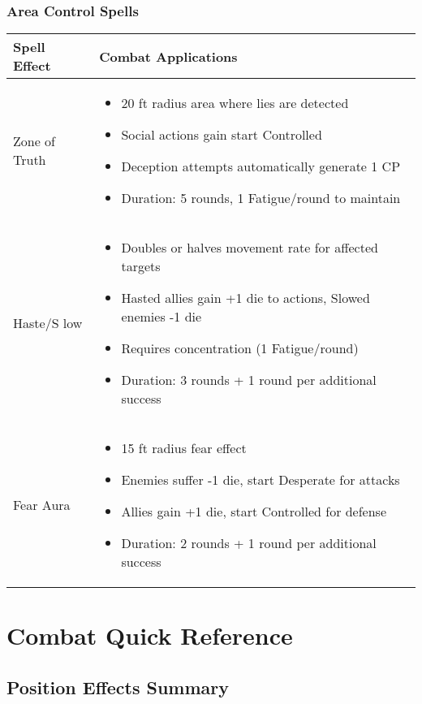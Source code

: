 \documentclass[11pt,letterpaper]{article}
\begin{document}
\subsubsection{Area Control Spells}

\begin{longtable}{|>{\raggedright\arraybackslash}p{4cm}|>{\raggedright\arraybackslash}p{8cm}|}
\hline
\textbf{Spell Effect} & \textbf{Combat Applications} \\
\hline
Zone of Truth & 
\begin{itemize}
    \item 20 ft radius area where lies are detected
    \item Social actions gain start Controlled
    \item Deception attempts automatically generate 1 CP
    \item Duration: 5 rounds, 1 Fatigue/round to maintain
\end{itemize} \\
\hline
Haste/S low & 
\begin{itemize}
    \item Doubles or halves movement rate for affected targets
    \item Hasted allies gain +1 die to actions, Slowed enemies -1 die
    \item Requires concentration (1 Fatigue/round)
    \item Duration: 3 rounds + 1 round per additional success
\end{itemize} \\
\hline
Fear Aura & 
\begin{itemize}
    \item 15 ft radius fear effect
    \item Enemies suffer -1 die, start Desperate for attacks
    \item Allies gain +1 die, start Controlled for defense
    \item Duration: 2 rounds + 1 round per additional success
\end{itemize} \\
\hline
\end{longtable}

\newpage

\section{Combat Quick Reference}

\subsection{Position Effects Summary}
\end{document}
